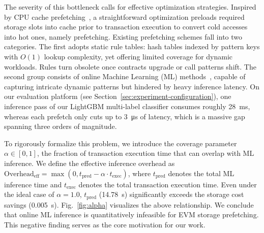 \documentclass[conference]{IEEEtran}
\begin{document}
The severity of this bottleneck calls for effective optimization strategies. Inspired by CPU cache prefetching~\cite{primer_prefetch}, a straightforward optimization preloads required storage slots into cache prior to transaction execution to convert cold accesses into hot ones, namely prefetching. Existing prefetching schemes fall into two categories. The first adopts static rule tables: hash tables indexed by pattern keys with $O(1)$ lookup complexity, yet offering limited coverage for dynamic workloads. Rules turn obsolete once contracts upgrade or call patterns shift. The second group consists of online Machine Learning (ML) methods~\cite{survey_prefetch}, capable of capturing intricate dynamic patterns but hindered by heavy inference latency. On our evaluation platform (see Section~\ref{sec:experiment-configuration}), one inference pass of our LightGBM multi-label classifier consumes roughly \qty{28}{\milli\second}, whereas each prefetch only cuts up to \qty{3}{\micro\second} of latency, which is a massive gap spanning three orders of magnitude.


To rigorously formalize this problem, we introduce the coverage parameter $\alpha \in [0,1]$, the fraction of transaction execution time that can overlap with ML inference. We define the effective inference overhead as $\text{Overhead}_{\text{eff}} = \max(0, t_{\text{pred}} - \alpha \cdot t_{\text{exec}})$, where $t_{\text{pred}}$ denotes the total ML inference time and $t_{\text{exec}}$ denotes the total transaction execution time. Even under the ideal case of $\alpha = 1.0$, $t_{\text{pred}}$ (\qty{14.78}{\second}) significantly exceeds the storage cost savings (\qty{0.005}{\second}). Fig.~\ref{fig:alpha} visualizes the above relationship. We conclude that online ML inference is quantitatively infeasible for EVM storage prefetching. This negative finding serves as the core motivation for our work.
\end{document}
